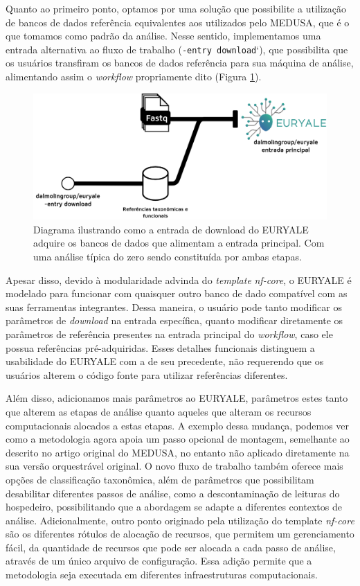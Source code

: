 \documentclass[
	12pt,				%
	oneside,			%
	a4paper,			%
	chapter=TITLE,		%
	section=TITLE,		%
	english,			%
	brazil				%
	]{abntex2}
\begin{document}
Quanto ao primeiro ponto, optamos por uma solução que possibilite a utilização de bancos de dados referência equivalentes aos utilizados pelo MEDUSA, que é o que tomamos como padrão da análise. Nesse sentido, implementamos uma entrada alternativa ao fluxo de trabalho (\texttt{-entry\ download}`), que possibilita que os usuários transfiram os bancos de dados referência para sua máquina de análise, alimentando assim o \emph{workflow} propriamente dito (Figura \ref{fig:entries}).
\begin{figure}[H]

{\centering \includegraphics[width=0.7\linewidth]{figure/euryale_entries.drawio} 

}

\caption{Diagrama ilustrando como a entrada de download do EURYALE adquire os bancos de dados que alimentam a entrada principal. Com uma análise típica do zero sendo constituída por ambas etapas.}\label{fig:entries}
\end{figure}
Apesar disso, devido à modularidade advinda do \emph{template} \emph{nf-core}, o EURYALE é modelado para funcionar com quaisquer outro banco de dado compatível com as suas ferramentas integrantes. Dessa maneira, o usuário pode tanto modificar os parâmetros de \emph{download} na entrada específica, quanto modificar diretamente os parâmetros de referência presentes na entrada principal do \emph{workflow}, caso ele possua referências pré-adquiridas. Esses detalhes funcionais distinguem a usabilidade do EURYALE com a de seu precedente, não requerendo que os usuários alterem o código fonte para utilizar referências diferentes.

Além disso, adicionamos mais parâmetros ao EURYALE, parâmetros estes tanto que alterem as etapas de análise quanto aqueles que alteram os recursos computacionais alocados a estas etapas. A exemplo dessa mudança, podemos ver como a metodologia agora apoia um passo opcional de montagem, semelhante ao descrito no artigo original do MEDUSA, no entanto não aplicado diretamente na sua versão orquestrável original. O novo fluxo de trabalho também oferece mais opções de classificação taxonômica, além de parâmetros que possibilitam desabilitar diferentes passos de análise, como a descontaminação de leituras do hospedeiro, possibilitando que a abordagem se adapte a diferentes contextos de análise. Adicionalmente, outro ponto originado pela utilização do template \emph{nf-core} são os diferentes rótulos de alocação de recursos, que permitem um gerenciamento fácil, da quantidade de recursos que pode ser alocada a cada passo de análise, através de um único arquivo de configuração. Essa adição permite que a metodologia seja executada em diferentes infraestruturas computacionais.
\end{document}
